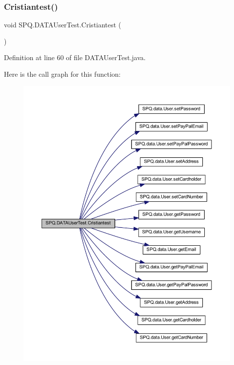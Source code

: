 \subsubsection{\texorpdfstring{Cristiantest()}{Cristiantest()}}
{\footnotesize\ttfamily void S\+P\+Q.\+D\+A\+T\+A\+User\+Test.\+Cristiantest (\begin{DoxyParamCaption}{ }\end{DoxyParamCaption})}



Definition at line 60 of file D\+A\+T\+A\+User\+Test.\+java.

Here is the call graph for this function\+:
\nopagebreak
\begin{figure}[H]
\begin{center}
\leavevmode
\includegraphics[width=350pt]{class_s_p_q_1_1_d_a_t_a_user_test_a7defc94d9391e6721dee5c627f75e1fb_cgraph}
\end{center}
\end{figure}
\mbox{\label{class_s_p_q_1_1_d_a_t_a_user_test_a04242b7156b6bb7828bd569de8027fad}} 
